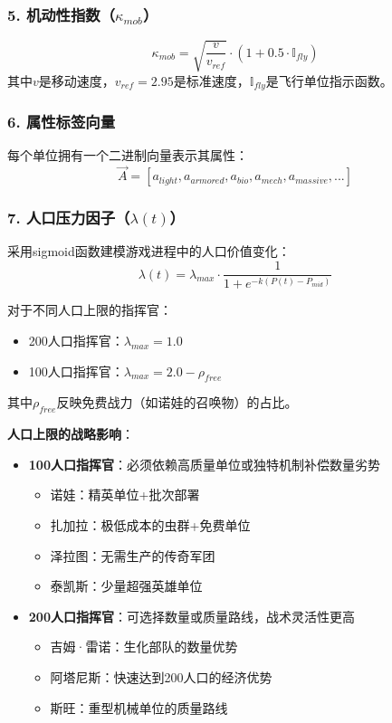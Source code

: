 \documentclass[a4paper,12pt]{article}
\begin{document}
\subsubsection{5. 机动性指数（$\kappa_{mob}$）}
\begin{equation}
\kappa_{mob} = \sqrt{\frac{v}{v_{ref}}} \cdot (1 + 0.5 \cdot \mathbb{I}_{fly})
\end{equation}
其中$v$是移动速度，$v_{ref} = 2.95$是标准速度，$\mathbb{I}_{fly}$是飞行单位指示函数。

\subsubsection{6. 属性标签向量}
每个单位拥有一个二进制向量表示其属性：
\begin{equation}
\vec{A} = [a_{light}, a_{armored}, a_{bio}, a_{mech}, a_{massive}, ...]
\end{equation}

\subsubsection{7. 人口压力因子（$\lambda(t)$）}
采用sigmoid函数建模游戏进程中的人口价值变化：
\begin{equation}
\lambda(t) = \lambda_{max} \cdot \frac{1}{1 + e^{-k(P(t) - P_{mid})}}
\end{equation}

对于不同人口上限的指挥官：
\begin{itemize}
\item 200人口指挥官：$\lambda_{max} = 1.0$
\item 100人口指挥官：$\lambda_{max} = 2.0 - \rho_{free}$
\end{itemize}

其中$\rho_{free}$反映免费战力（如诺娃的召唤物）的占比。

\textbf{人口上限的战略影响}：
\begin{itemize}
\item \textbf{100人口指挥官}：必须依赖高质量单位或独特机制补偿数量劣势
  \begin{itemize}
  \item 诺娃：精英单位+批次部署
  \item 扎加拉：极低成本的虫群+免费单位
  \item 泽拉图：无需生产的传奇军团
  \item 泰凯斯：少量超强英雄单位
  \end{itemize}
\item \textbf{200人口指挥官}：可选择数量或质量路线，战术灵活性更高
  \begin{itemize}
  \item 吉姆·雷诺：生化部队的数量优势
  \item 阿塔尼斯：快速达到200人口的经济优势
  \item 斯旺：重型机械单位的质量路线
  \end{itemize}
\end{itemize}
\end{document}
